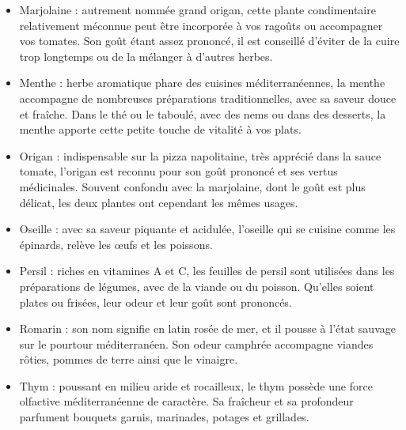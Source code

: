 \documentclass[a4paper,twoside]{report}
\begin{document}
\begin{itemize}
\item Marjolaine : autrement nommée \og grand origan\fg, cette plante condimentaire relativement méconnue peut être incorporée à vos ragoûts ou accompagner vos tomates. Son goût étant assez prononcé, il est conseillé d’éviter de la cuire trop longtemps ou de la mélanger à d’autres herbes.

\item Menthe : herbe aromatique phare des cuisines méditerranéennes, la menthe accompagne de nombreuses préparations traditionnelles, avec sa saveur douce et fraîche. Dans le thé ou le taboulé, avec des nems ou dans des desserts, la menthe apporte cette petite touche de vitalité à vos plats.

\item Origan : indispensable sur la pizza napolitaine, très apprécié dans la sauce tomate, l’origan est reconnu pour son goût prononcé et ses vertus médicinales. Souvent confondu avec la marjolaine, dont le goût est plus délicat, les deux plantes ont cependant les mêmes usages.

\item Oseille : avec sa saveur piquante et acidulée, l’oseille qui se cuisine comme les épinards, relève les œufs et les poissons.

\item Persil : riches en vitamines A et C, les feuilles de persil sont utilisées dans les préparations de légumes, avec de la viande ou du poisson. Qu’elles soient plates ou frisées, leur odeur et leur goût sont prononcés.

\item Romarin : son nom signifie en latin rosée de mer, et il pousse à l’état sauvage sur le pourtour méditerranéen. Son odeur camphrée accompagne viandes rôties, pommes de terre ainsi que le vinaigre.

\item Thym : poussant en milieu aride et rocailleux, le thym possède une force olfactive méditerranéenne de caractère. Sa fraîcheur et sa profondeur parfument bouquets garnis, marinades, potages et grillades.
\end{itemize}
\end{document}
